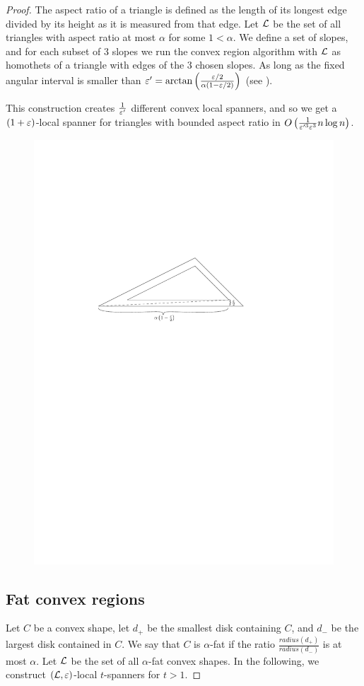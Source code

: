 \documentclass[12pt]{article}%
\begin{document}
\begin{proof}
The aspect ratio of a triangle is defined as the length of its longest
edge divided by its height as it is measured from that edge. Let $\mathcal{L}$
be the set of all triangles with aspect ratio at most $\alpha$ for
some $1 < \alpha$. We define a set of slopes, and for each subset of 3
slopes we run the convex region algorithm with $\mathcal{L}$ as homothets of a
triangle with edges of the 3 chosen slopes. As long as the fixed
angular interval is smaller than
$\varepsilon' = \arctan\left(\frac{\varepsilon/2}{\alpha(1-\varepsilon/2)}\right)$ (see
).

This construction creates $\frac{1}{\varepsilon'}$ different convex local
spanners, and so we get a $(1+\varepsilon)$-local spanner for triangles with
bounded aspect ratio in
$O\left(\frac{1}{\varepsilon'^3\varepsilon^3} n\log n\right)$.


\begin{figure}
    \centering
    \includegraphics[width=0.6\linewidth]{figs/triangle_shadow}
\end{figure}


\subsection{Fat convex regions}

Let $C$ be a convex shape, let $d_+$ be the smallest disk containing $C$, and $d_-$ be the largest disk contained in $C$. We say that $C$ is $\alpha$-fat if the ratio $\frac{radius(d_+)}{radius(d_-)}$ is at most $\alpha$. Let $\mathcal{L}$ be the set of all $\alpha$-fat convex shapes. In the following, we construct $(\mathcal{L}, \varepsilon)$-local $t$-spanners for $t>1$. 


\end{proof}
\end{document}
